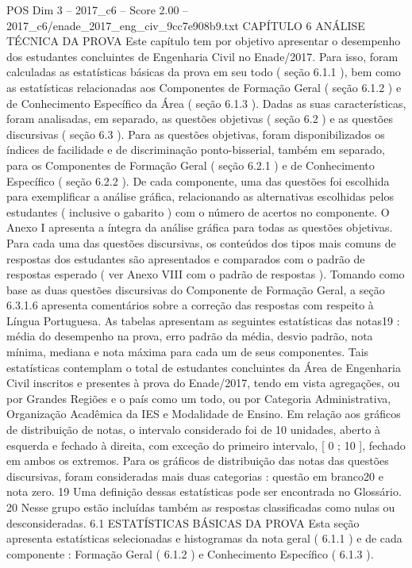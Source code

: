 \begin{textsample}{POS Dim 3 – 2017\_c6 – Score 2.00 – 2017\_c6/enade\_2017\_eng\_civ\_9cc7e908b9.txt}  \label{ex:f3_pos_193}
CAPÍTULO 6 ANÁLISE TÉCNICA DA PROVA Este capítulo tem por objetivo apresentar o desempenho dos estudantes concluintes de Engenharia Civil no Enade/2017.
Para isso, foram calculadas as estatísticas básicas da prova em seu todo ( seção 6.1.1 ), bem como as estatísticas relacionadas aos Componentes de Formação Geral ( seção 6.1.2 ) e de Conhecimento Específico da Área ( seção 6.1.3 ).
Dadas as suas características, foram analisadas, em separado, as questões objetivas ( seção 6.2 ) e as questões discursivas ( seção 6.3 ).
Para as questões objetivas, foram disponibilizados os índices de facilidade e de discriminação ponto-bisserial, também em separado, para os Componentes de Formação Geral ( seção 6.2.1 ) e de Conhecimento Específico ( seção 6.2.2 ).
De cada componente, uma das questões foi escolhida para exemplificar a análise gráfica, relacionando as alternativas escolhidas pelos estudantes ( inclusive o gabarito ) com o número de acertos no componente.
O Anexo I apresenta a íntegra da análise gráfica para todas as questões objetivas.
Para cada uma das questões discursivas, os conteúdos dos tipos mais comuns de respostas dos estudantes são apresentados e comparados com o padrão de respostas esperado ( ver Anexo VIII com o padrão de respostas ).
Tomando como base as duas questões discursivas do Componente de Formação Geral, a seção 6.3.1.6 apresenta comentários sobre a correção das respostas com respeito à Língua Portuguesa.
As tabelas apresentam as seguintes estatísticas das notas19 : média do desempenho na prova, erro padrão da média, desvio padrão, nota mínima, mediana e nota máxima para cada um de seus componentes.
Tais estatísticas contemplam o total de estudantes concluintes da Área de Engenharia Civil inscritos e presentes à prova do Enade/2017, tendo em vista agregações, ou por Grandes Regiões e o país como um todo, ou por Categoria Administrativa, Organização Acadêmica da IES e Modalidade de Ensino.
Em relação aos gráficos de distribuição de notas, o intervalo considerado foi de 10 unidades, aberto à esquerda e fechado à direita, com exceção do primeiro intervalo, [ 0 ; 10 ], fechado em ambos os extremos.
Para os gráficos de distribuição das notas das questões discursivas, foram consideradas mais duas categorias : questão em branco20 e nota zero. 19 Uma definição dessas estatísticas pode ser encontrada no Glossário. 20 Nesse grupo estão incluídas também as respostas classificadas como nulas ou desconsideradas. 6.1 ESTATÍSTICAS BÁSICAS DA PROVA Esta seção apresenta estatísticas selecionadas e histogramas da nota geral ( 6.1.1 ) e de cada componente : Formação Geral ( 6.1.2 ) e Conhecimento Específico ( 6.1.3 ).

\end{textsample}
